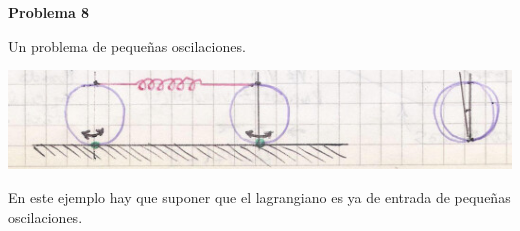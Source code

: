 \documentclass[10pt,oneside]{CBFT_book}
\begin{document}
\begin{ejemplo}{\bf Problema 8}

Un problema de pequeñas oscilaciones.

\includegraphics[scale=0.5]{images/fig_mc_problema_8.jpg} 

En este ejemplo hay que suponer que el lagrangiano es ya de entrada de pequeñas oscilaciones.

\end{ejemplo}














\end{document}
